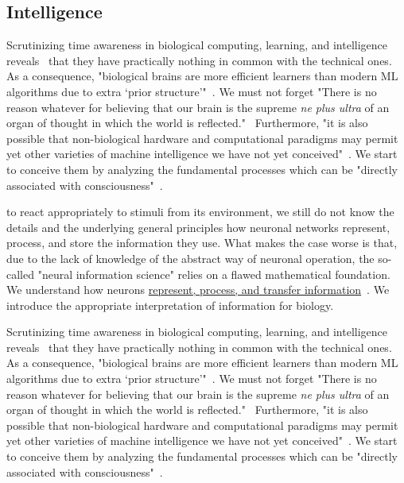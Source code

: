 \subsection*{Intelligence\label{sec:StateIntelligence}}
Scrutinizing time awareness in biological computing, learning, and intelligence reveals~\cite {WhyMachineLearningDifferent:2021} that they have practically nothing in common with the technical ones. 
As a consequence, "biological brains are more efficient learners than modern \gls{ML}
algorithms due to extra ‘prior structure’"~\cite{FittingElephants:2021}.
 We must not forget "There is no reason whatever for believing that our brain is the supreme \textit{ne plus ultra} of an organ of thought in which the world is reflected."~\cite{Schrodinger:1992}
 Furthermore, "it is also possible that non-biological hardware and computational paradigms may permit yet other varieties of machine intelligence we have not yet conceived"~\cite{FittingElephants:2021,FeynmanComputation:2018}. We start to conceive them by analyzing the fundamental
 processes which can be "directly associated with consciousness"~\cite{Schrodinger:1992}.

to react appropriately to stimuli from its environment,
we still do not know the details and the underlying general principles
how neuronal networks represent, process, and store the information they use.
What makes the case worse is that, due to the lack of knowledge of the abstract way of neuronal operation,
the so-called "neural information science" relies on a flawed mathematical foundation.
We understand how neurons 
\hyperlink{information-biology}
{represent, process, and transfer information}~\cite{VeghNeuralShannon:2022,VeghChannelCapacity:2023}.
We introduce the appropriate interpretation of
{information for biology}.


Scrutinizing time awareness in biological computing, learning, and intelligence reveals~\cite {WhyMachineLearningDifferent:2021} that they have practically nothing in common with the technical ones. 
As a consequence, "biological brains are more efficient learners than modern \gls{ML}
algorithms due to extra ‘prior structure’"~\cite{FittingElephants:2021}.
 We must not forget "There is no reason whatever for believing that our brain is the supreme \textit{ne plus ultra} of an organ of thought in which the world is reflected."~\cite{Schrodinger:1992}
 Furthermore, "it is also possible that non-biological hardware and computational paradigms may permit yet other varieties of machine intelligence we have not yet conceived"~\cite{FittingElephants:2021,FeynmanComputation:2018}. We start to conceive them by analyzing the fundamental
 processes which can be "directly associated with consciousness"~\cite{Schrodinger:1992}.




